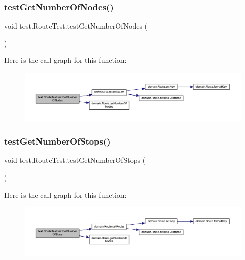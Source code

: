 \subsubsection{\texorpdfstring{test\+Get\+Number\+Of\+Nodes()}{testGetNumberOfNodes()}}
{\footnotesize\ttfamily void test.\+Route\+Test.\+test\+Get\+Number\+Of\+Nodes (\begin{DoxyParamCaption}{ }\end{DoxyParamCaption})}

Here is the call graph for this function\+:\nopagebreak
\begin{figure}[H]
\begin{center}
\leavevmode
\includegraphics[width=350pt]{classtest_1_1_route_test_a11cca1688e58c33a830799aabf3c193f_cgraph}
\end{center}
\end{figure}
\mbox{\label{classtest_1_1_route_test_af6681e248b53ea74f2b330d454b41798}} 
\subsubsection{\texorpdfstring{test\+Get\+Number\+Of\+Stops()}{testGetNumberOfStops()}}
{\footnotesize\ttfamily void test.\+Route\+Test.\+test\+Get\+Number\+Of\+Stops (\begin{DoxyParamCaption}{ }\end{DoxyParamCaption})}

Here is the call graph for this function\+:\nopagebreak
\begin{figure}[H]
\begin{center}
\leavevmode
\includegraphics[width=350pt]{classtest_1_1_route_test_af6681e248b53ea74f2b330d454b41798_cgraph}
\end{center}
\end{figure}
\mbox{\label{classtest_1_1_route_test_a7dacc77eab109864a56245621d7ec28e}} 
